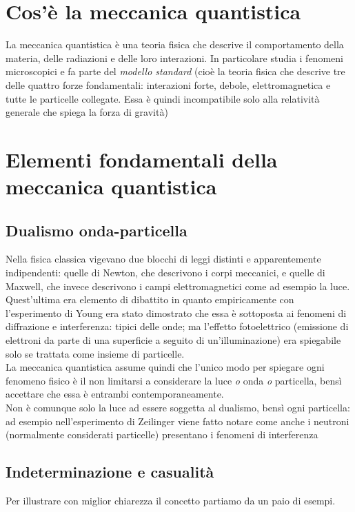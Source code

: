 \section{Cos'è la meccanica quantistica}
La meccanica quantistica è una teoria fisica che descrive il comportamento della materia, delle radiazioni e delle loro interazioni. In particolare studia i fenomeni microscopici e fa parte del \textit{modello standard} (cioè la teoria fisica che descrive tre delle quattro forze fondamentali: interazioni forte, debole, elettromagnetica e tutte le particelle collegate. Essa è quindi incompatibile solo alla relatività generale che spiega la forza di gravità)

\section{Elementi fondamentali della meccanica quantistica}
\subsection{Dualismo onda-particella}
Nella fisica classica vigevano due blocchi di leggi distinti e apparentemente indipendenti: quelle di Newton, che descrivono i corpi meccanici, e quelle di Maxwell, che invece descrivono i campi elettromagnetici come ad esempio la luce. Quest'ultima era elemento di dibattito in quanto empiricamente con l'esperimento di Young era stato dimostrato che essa è sottoposta ai fenomeni di diffrazione e interferenza: tipici delle onde; ma l'effetto fotoelettrico (emissione di elettroni da parte di una superficie a seguito di un'illuminazione) era spiegabile solo se trattata come insieme di particelle.\\
La meccanica quantistica assume quindi che l'unico modo per spiegare ogni fenomeno fisico è il non limitarsi a considerare la luce \textit{o} onda \textit{o} particella, bensì accettare che essa è entrambi contemporaneamente.\\
Non è comunque solo la luce ad essere soggetta al dualismo, bensì ogni particella: ad esempio nell'esperimento di Zeilinger viene fatto notare come anche i neutroni (normalmente considerati particelle) presentano i fenomeni di interferenza
\subsection{Indeterminazione e casualità}
Per illustrare con miglior chiarezza il concetto partiamo da un paio di esempi.
